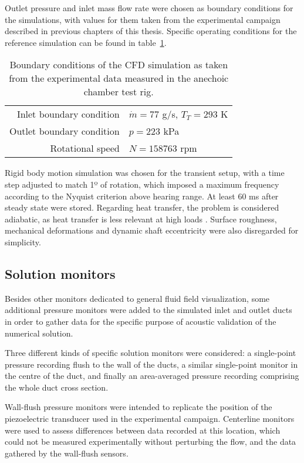 Outlet pressure and inlet mass flow rate were chosen as boundary conditions for the simulations, with values for them taken from the experimental campaign described in previous chapters of this thesis. Specific operating conditions for the reference simulation can be found in table~\ref{tab:operatingConditions}.

\begin{table}
\centering
\caption[Boundary conditions of the CFD simulation]{Boundary conditions of the CFD simulation as taken from the experimental data measured in the anechoic chamber test rig.}
\footnotesize
\begin{tabular}{rl}
\toprule
Inlet boundary condition & $\dot{m}=77$ g/s, $T_T=293$ K\\
Outlet boundary condition &  $p=223$ kPa \\
Rotational speed & $N=158763$ rpm \\ \bottomrule
\end{tabular}
\label{tab:operatingConditions}
\end{table}

Rigid body motion simulation was chosen for the transient setup, with a time step adjusted to match 1º of rotation, which imposed a maximum frequency according to the Nyquist criterion above hearing range. At least 60 ms after steady state were stored. Regarding heat transfer, the problem is considered adiabatic, as heat transfer is less relevant at high loads \cite{serrano2013importance,serrano2014procedure,serrano2014methodology}. Surface roughness, mechanical deformations and dynamic shaft eccentricity were also disregarded for simplicity.

\subsection{Solution monitors}\label{sub:cfd_sol_monitors}

Besides other monitors dedicated to general fluid field visualization, some additional pressure monitors were added to the simulated inlet and outlet ducts in order to gather data for the specific purpose of acoustic validation of the numerical solution.

Three different kinds of specific solution monitors were considered: a single-point pressure recording flush to the wall of the ducts, a similar single-point monitor in the centre of the duct, and finally an area-averaged pressure recording comprising the whole duct cross section. 

Wall-flush pressure monitors were intended to replicate the position of the piezoelectric transducer used in the experimental campaign. Centerline monitors were used to assess differences between data recorded at this location, which could not be measured experimentally without perturbing the flow, and the data gathered by the wall-flush sensors. 

